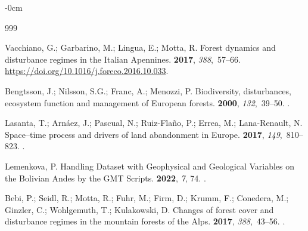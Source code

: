 \documentclass[jimaging,article,accept,pdftex,oneauthor]{Definitions/mdpi}
\begin{document}
\begin{adjustwidth}{-\extralength}{0cm}


\begin{thebibliography}{999}

Vacchiano, G.; Garbarino, M.; Lingua, E.; Motta, R.
\newblock Forest dynamics and disturbance regimes in the Italian Apennines.
 {\bf 2017}, {\em 388},~57--66. %
 {\url{https://doi.org/10.1016/j.foreco.2016.10.033}}.

Bengtsson, J.; Nilsson, S.G.; Franc, A.; Menozzi, P.
\newblock Biodiversity, disturbances, ecosystem function and management of
  European forests.
 {\bf 2000}, {\em 132},~39--50.
.

Lasanta, T.; Arnáez, J.; Pascual, N.; Ruiz-Flaño, P.; Errea, M.;
  Lana-Renault, N.
\newblock Space–time process and drivers of land abandonment in Europe.
 {\bf 2017}, {\em 149},~810--823.
.

Lemenkova, P.
\newblock Handling Dataset with Geophysical and Geological Variables on the
  Bolivian Andes by the GMT Scripts.
 {\bf 2022}, {\em 7}, {74.}
.

Bebi, P.; Seidl, R.; Motta, R.; Fuhr, M.; Firm, D.; Krumm, F.; Conedera, M.;
  Ginzler, C.; Wohlgemuth, T.; Kulakowski, D.
\newblock Changes of forest cover and disturbance regimes in the mountain
  forests of the Alps.
 {\bf 2017}, {\em 388},~43--56.
.


\end{thebibliography}
\end{adjustwidth}
\end{document}
